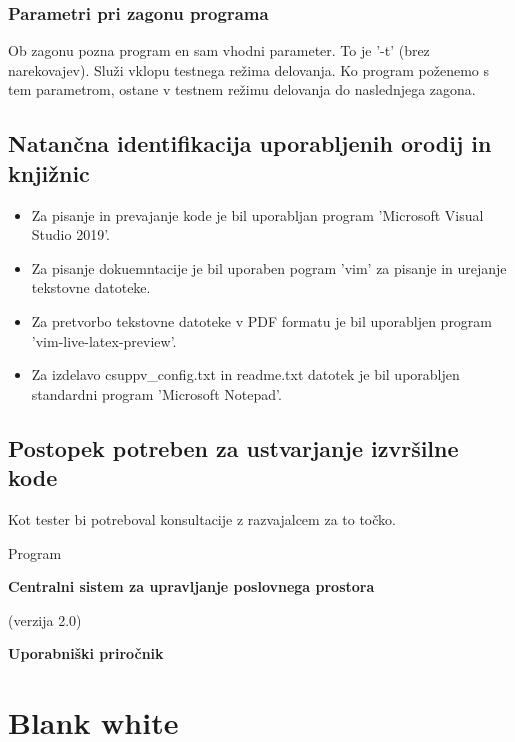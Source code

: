 \documentclass[a4paper,12pt]{article}
\begin{document}
			\subsubsection{Parametri pri zagonu programa}

			\quad Ob  zagonu  pozna  program  en  sam  vhodni  parameter.  To  je  '-t'  (brez  narekovajev).  
			Služi  vklopu  testnega režima delovanja. Ko program poženemo s tem parametrom, ostane v testnem 
			režimu delovanja do naslednjega zagona.

		\subsection{Natančna identifikacija uporabljenih orodij in knjižnic}

			\begin{itemize}

				\item Za pisanje in prevajanje kode je bil uporabljan program 'Microsoft Visual Studio 2019'.
				\item Za pisanje dokuemntacije je bil uporaben pogram 'vim' za pisanje in urejanje tekstovne datoteke.
				\item Za pretvorbo tekstovne datoteke v PDF formatu je bil uporabljen program 'vim-live-latex-preview'.
				\item Za izdelavo csuppv\_config.txt in readme.txt  datotek je bil uporabljen standardni program 'Microsoft Notepad'.

			\end{itemize}

		\subsection{Postopek potreben za ustvarjanje izvršilne kode}

			\qquad Kot tester bi potreboval konsultacije z razvajalcem za to točko.


\newpage

	{
	\centering

	\hspace{0cm}

	\vspace{4cm}

	{\large{Program}}

	\vspace{1cm}

	{\bf{\Huge{Centralni sistem za upravljanje poslovnega prostora}}}

	\vspace{0.5cm}

	{(verzija 2.0)}
	
	\vspace{1.5cm}

	{\bf{\Large{Uporabniški priročnik}}}

	{
	\color{white} \section{Blank white}
	}
	}
\end{document}
